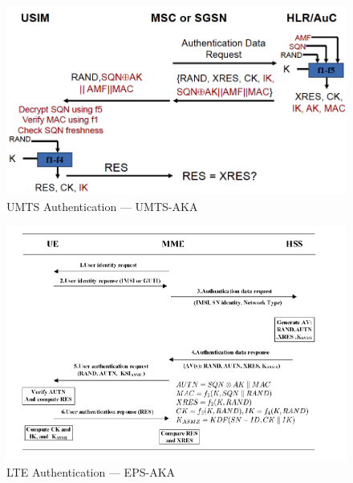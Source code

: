 \documentclass[a4paper]{report}
\begin{document}
\begin{figure}
\begin{mdframed}
\includegraphics[scale=0.35]{UMTS_Authentication.png}
\caption{UMTS Authentication --- UMTS-AKA}
\label{fig:prob2a}
\end{mdframed}
\end{figure}

\begin{figure}
\begin{mdframed}
\includegraphics[scale=0.43]{LTE_Authentication.jpg}
\caption{LTE Authentication --- EPS-AKA}
\label{fig:prob2b}
\end{mdframed}
\end{figure}
\end{document}
